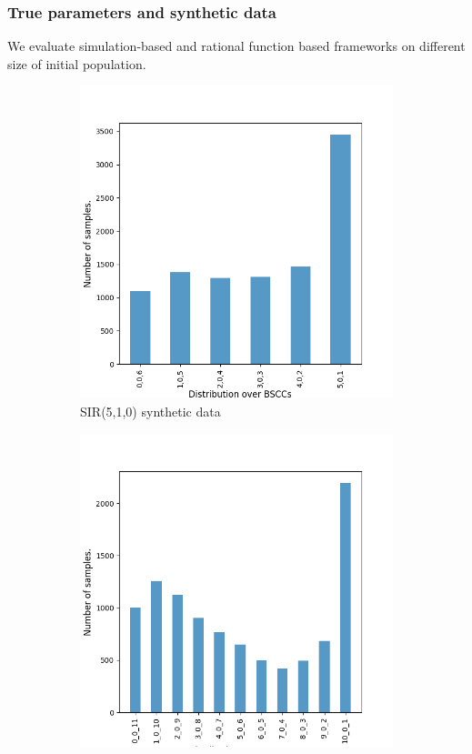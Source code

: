 \subsubsection{True parameters and synthetic data}
We evaluate simulation-based and rational function based frameworks on different size of initial population.
\begin{figure}[H]
    \centering
    \begin{subfigure}{0.3\textwidth}
        \centering
        \includegraphics[width=\linewidth]{figures/sir510_data.png}
        \caption{SIR(5,1,0) synthetic data}
    \end{subfigure}
    \hfill
    \begin{subfigure}{0.3\textwidth}
        \centering
        \includegraphics[width=\linewidth]{figures/sir1010_data.png}

\end{subfigure}
\end{figure}
